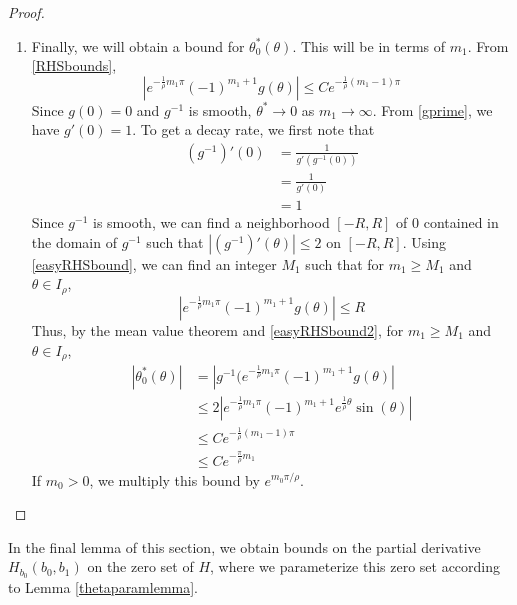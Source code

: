 \documentclass[thesis.tex]{subfiles}
\begin{document}
\begin{lemma}
\begin{proof}
\begin{enumerate}
	\item Finally, we will obtain a bound for $\theta_0^*(\theta)$. This will be in terms of $m_1$. From \eqref{RHSbounds},
	\begin{equation}\label{easyRHSbound}
	|e^{ -\frac{1}{\rho} m_1 \pi } (-1)^{m_1 + 1} g(\theta)| \leq C e^{ -\frac{1}{\rho}(m_1 - 1) \pi }
	\end{equation}
	Since $g(0) = 0$ and $g^{-1}$ is smooth, $\theta^* \rightarrow 0$ as $m_1 \rightarrow \infty$. From \eqref{gprime}, we have $g'(0) = 1$. To get a decay rate, we first note that
	\begin{align*}
	(g^{-1})'(0) &= \frac{1}{g'(g^{-1}(0))} \\
	&= \frac{1}{g'(0)} \\
	&= 1
	\end{align*}
	Since $g^{-1}$ is smooth, we can find a neighborhood $[-R, R]$ of 0 contained in the domain of $g^{-1}$ such that $|(g^{-1})'(\theta)| \leq 2$ on $[-R, R]$. Using \eqref{easyRHSbound}, we can find an integer $M_1$ such that for $m_1 \geq M_1$ and $\theta \in I_\rho$,
	\begin{equation}\label{easyRHSbound2}
	|e^{ -\frac{1}{\rho} m_1 \pi } (-1)^{m_1 + 1} g(\theta)| \leq R
	\end{equation}
	Thus, by the mean value theorem and \eqref{easyRHSbound2}, for $m_1 \geq M_1$ and $\theta \in I_\rho$,
	\begin{align*}
	|\theta_0^*(\theta)| &= | g^{-1}(e^{ -\frac{1}{\rho} m_1 \pi } (-1)^{m_1 + 1} g(\theta) | \\
	&\leq 2 |e^{ -\frac{1}{\rho} m_1 \pi } (-1)^{m_1 + 1}  e^{ \frac{1}{\rho} \theta } \sin(\theta)| \\
	&\leq C e^{ -\frac{1}{\rho}(m_1 - 1) \pi } \\
	&\leq C e^{ -\frac{\pi}{\rho} m_1 }
	\end{align*}
	If $m_0 > 0$, we multiply this bound by $e^{m_0 \pi/\rho}$.
\end{enumerate}
\end{proof}
\end{lemma}

In the final lemma of this section, we obtain bounds on the partial derivative $H_{b_0} (b_0, b_1)$ on the zero set of $H$, where we parameterize this zero set according to Lemma \ref{thetaparamlemma}.

\end{document}
